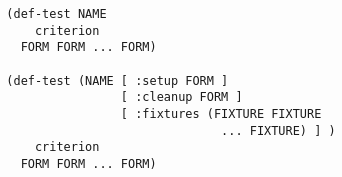 \begin{verbatim}
  (def-test NAME
      criterion
    FORM FORM ... FORM)

  (def-test (NAME [ :setup FORM ]
                  [ :cleanup FORM ]
                  [ :fixtures (FIXTURE FIXTURE
                                ... FIXTURE) ] )
      criterion
    FORM FORM ... FORM)
\end{verbatim}
